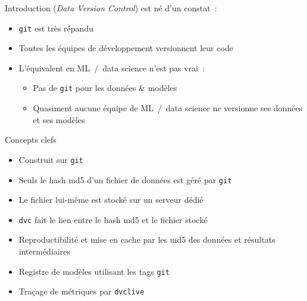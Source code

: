 \begin{frame}{Introduction}
   (\textit{Data Version Control}) est né d'un constat~:

  \begin{itemize}
    \item \texttt{git} est très répandu
    \item Toutes les équipes de développement versionnent leur code
    \item L'équivalent en ML~/~data science n'est pas vrai~:
    \begin{itemize}
      \item Pas de \texttt{git} pour les données \& modèles
      \item Quasiment aucune équipe de ML~/~data science ne versionne ses données et ses modèles
    \end{itemize}
  \end{itemize}
\end{frame}

\begin{frame}{Concepts clefs}
  \begin{itemize}
    \item Construit sur \texttt{git}
    \item Seuls le hash md5 d'un fichier de données est géré par \texttt{git}
    \item Le fichier lui-même est stocké sur un serveur dédié
    \item \texttt{dvc} fait le lien entre le hash md5 et le fichier stocké
    \item Reproductibilité et mise en cache par les md5 des données et résultats intermédiaires
    \item Registre de modèles utilisant les tags \texttt{git}
    \item Traçage de métriques par \texttt{dvclive}
  \end{itemize}
\end{frame}

